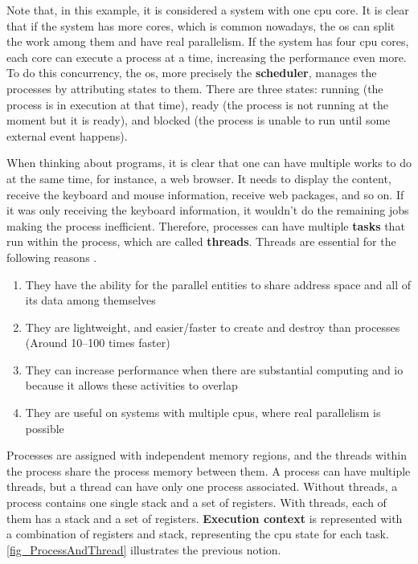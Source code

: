 Note that, in this example, it is considered a system with one \gls{cpu} core. It is clear that if the system has more cores, which is common nowadays, the \gls{os} can split the work among them and have real parallelism. If the system has four \gls{cpu} cores, each core can execute a process at a time, increasing the performance even more. To do this concurrency, the \gls{os}, more precisely the \textbf{scheduler}, manages the processes by attributing states to them. There are three states: running (the process is in execution at that time), ready (the process is not running at the moment but it is ready), and blocked (the process is unable to run until some external event happens). 

When thinking about programs, it is clear that one can have multiple works to do at the same time, for instance, a web browser. It needs to display the content, receive the keyboard and mouse information, receive web packages, and so on. If it was only receiving the keyboard information, it wouldn't do the remaining jobs making the process inefficient. Therefore, processes can have multiple \textbf{tasks} that run within the process, which are called \textbf{threads}. Threads are essential for the following reasons \cite{OSbook}.

\begin{enumerate}
    \item They have the ability for the parallel entities to share address space and all of its data among themselves

    \item They are lightweight, and easier/faster to create and destroy than processes (Around 10–100 times faster)

    \item They can increase performance when there are substantial  computing and \gls{io} because it allows these activities to overlap

    \item They are useful on systems with multiple \glspl{cpu}, where real parallelism is possible
\end{enumerate}

Processes are assigned with independent memory regions, and the threads within the process share the process memory between them. A process can have multiple threads, but a thread can have only one process associated. Without threads, a process contains one single stack and a set of registers. With threads, each of them has a stack and a set of registers. \textbf{Execution context} is represented with a combination of registers and stack, representing the \gls{cpu} state for each task. \autoref{fig_ProcessAndThread} illustrates the previous notion. 

